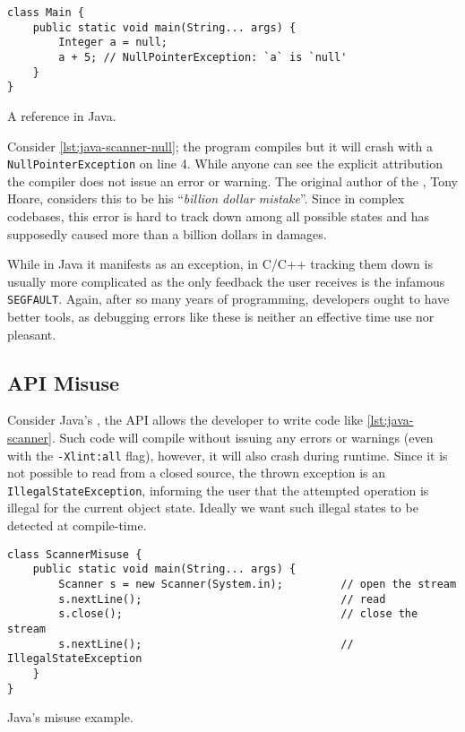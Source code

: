 \begin{listing}
    \begin{verbatim}
class Main {
    public static void main(String... args) {
        Integer a = null;
        a + 5; // NullPointerException: `a` is `null'
    }
}
    \end{verbatim}
    \caption{A  reference in Java.}
    \label{lst:java-scanner-null}
\end{listing}

Consider \autoref{lst:java-scanner-null}; the program compiles but it will crash with a \texttt{NullPointerException} on line 4.
While anyone can see the explicit  attribution the compiler does not issue an error or warning.
The original author of the , Tony Hoare, considers this to be his “\emph{billion dollar mistake}”.
Since in complex codebases, this error is hard to track down among all possible states and
has supposedly caused more than a billion dollars in damages.

While in Java it manifests as an exception,
in C/C++ tracking them down is usually more complicated as the only feedback the user receives is the infamous \texttt{SEGFAULT}.
Again, after so many years of programming, developers ought to have better tools,
as debugging errors like these is neither an effective time use nor pleasant.

\subsection{API Misuse}

Consider Java's , the \gls{API} allows the developer to write code like \autoref{lst:java-scanner}.
Such code will compile without issuing any errors or warnings (even with the \texttt{-Xlint:all} flag),
however, it will also crash during runtime.
Since it is not possible to read from a closed source, the thrown exception is an \texttt{IllegalStateException},
informing the user that the attempted operation is illegal for the current object state.
Ideally we want such illegal states to be detected at compile-time.

\begin{listing}
    \begin{verbatim}
class ScannerMisuse {
    public static void main(String... args) {
        Scanner s = new Scanner(System.in);         // open the stream
        s.nextLine();                               // read
        s.close();                                  // close the stream
        s.nextLine();                               // IllegalStateException
    }
}
    \end{verbatim}
    \caption{Java's  misuse example.}
    \label{lst:java-scanner}
\end{listing}

